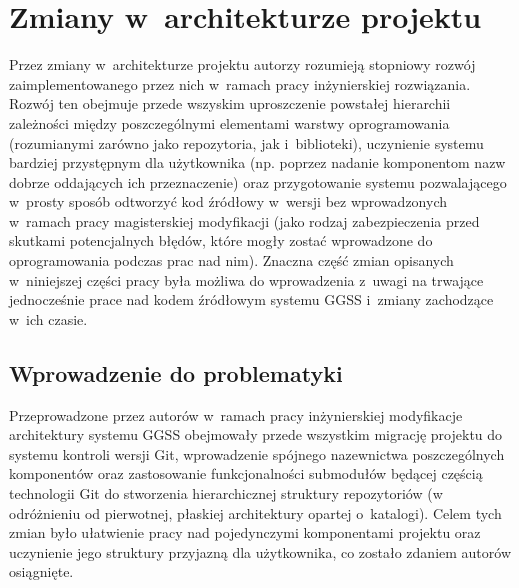 \section{Zmiany w~architekturze projektu}
Przez zmiany w~architekturze projektu autorzy rozumieją stopniowy rozwój zaimplementowanego przez nich w~ramach pracy inżynierskiej rozwiązania. Rozwój ten obejmuje przede wszyskim uproszczenie powstałej hierarchii zależności między poszczególnymi elementami warstwy oprogramowania (rozumianymi zarówno jako repozytoria, jak i~biblioteki), uczynienie systemu bardziej przystępnym dla użytkownika (np. poprzez nadanie komponentom nazw dobrze oddających ich przeznaczenie) oraz przygotowanie systemu pozwalającego w~prosty sposób odtworzyć kod źródłowy w~wersji bez wprowadzonych w~ramach pracy magisterskiej modyfikacji (jako rodzaj zabezpieczenia przed skutkami potencjalnych błędów, które mogły zostać wprowadzone do oprogramowania podczas prac nad nim). Znaczna część zmian opisanych w~niniejszej części pracy była możliwa do wprowadzenia z~uwagi na trwające jednocześnie prace nad kodem źródłowym systemu GGSS i~zmiany zachodzące w~ich czasie.

\subsection{Wprowadzenie do problematyki}
Przeprowadzone przez autorów w~ramach pracy inżynierskiej modyfikacje architektury systemu GGSS obejmowały przede wszystkim migrację projektu do systemu kontroli wersji Git, wprowadzenie spójnego nazewnictwa poszczególnych komponentów oraz zastosowanie funkcjonalności submodułów będącej częścią technologii Git do stworzenia hierarchicznej struktury repozytoriów (w odróżnieniu od pierwotnej, płaskiej architektury opartej o~katalogi). Celem tych zmian było ułatwienie pracy nad pojedynczymi komponentami projektu oraz uczynienie jego struktury przyjazną dla użytkownika, co zostało zdaniem autorów osiągnięte. 

